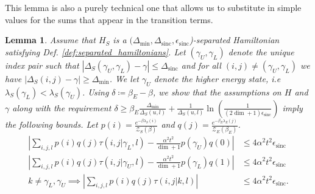 \documentclass{article}
\newtheorem{lemma}[theorem]{Lemma}
\newcommand{\parens}[1]{\left( #1 \right)}
\newcommand{\abs}[1]{\left| #1 \right|}
\newcommand{\partfun}{\mathcal{Z}}
\DeclareMathOperator{\sinc}{sinc}
\begin{document}
This lemma is also a purely technical one that allows us to substitute in simple values for the sums that appear in the transition terms. 
\begin{lemma} \label{lem:big_tau_sum_simplifier}
    Assume that $H_S$ is a $(\Delta_{\min}, \Delta_{\sinc}, \epsilon_{\sinc}$)-separated Hamiltonian satisfying Def. \ref{def:separated_hamiltonians}. Let $(\gamma_U,\gamma_L)$ denote the unique index pair such that $|\Delta_S(\gamma_U,\gamma_L) - \gamma| \leq \Delta_{\sinc}$ and for all $(i,j) \neq (\gamma_U, \gamma_L)$ we have $|\Delta_S(i,j) - \gamma| \geq \Delta_{\min}$. We let $\gamma_U$ denote the higher energy state, i.e $\lambda_S(\gamma_L) < \lambda_S(\gamma_U)$. Using $\delta \coloneqq \beta_E - \beta$, we show that the assumptions on $H$ and $\gamma$ along with the requirement $\delta \geq \beta_E \frac{\Delta_{\min}}{\Delta_S(u,l)} + \frac{1}{\Delta_S(u,l)} \ln \parens{\frac{1}{(2\dim + 1) \epsilon_{\sinc}}}$ imply the following bounds.
    Let $p(i) = \frac{e^{-\beta \lambda_S(i)}}{\partfun_S(\beta)}$ and $q(j) = \frac{e^{-\beta_E \lambda_E(j)}}{\partfun_E(\beta_E)}$. 
    \begin{align}
        \abs{\sum_{i, j, l} p(i) q(j) \tau(i,j| \gamma_L, l) - \frac{\alpha^2 t^2}{\dim + 1} p(\gamma_U) q(0)} &\leq 4 \alpha^2 t^2 \epsilon_{\sinc}  \\
        \abs{\sum_{i, j, l} p(i) q(j) \tau(i,j| \gamma_U, l) - \frac{\alpha^2 t^2}{\dim + 1} p(\gamma_L) q(1)} &\leq 4  \alpha^2 t^2 \epsilon_{\sinc} \\
        k \neq \gamma_L, \gamma_U \implies \abs{\sum_{i,j,l} p(i) q(j) \tau(i,j| k, l) } &\leq 4 \alpha^2 t^2 \epsilon_{\sinc}.
    \end{align}
\end{lemma}
\end{document}

